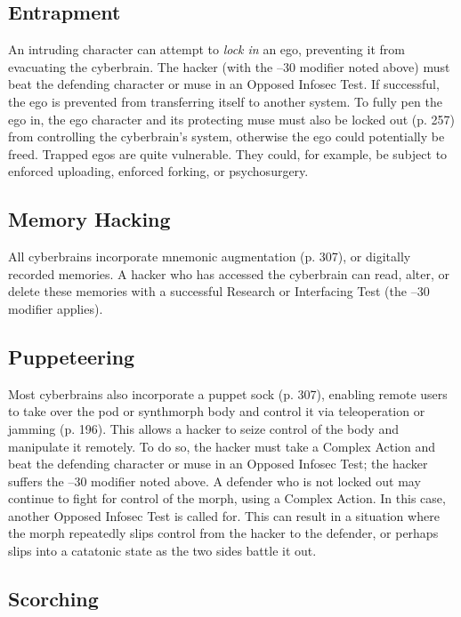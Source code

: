 \subsection{Entrapment}

An intruding character can attempt to \textit{lock in} an ego, 
preventing it from evacuating the cyberbrain. The 
hacker (with the –30 modifier noted above) must 
beat the defending character or muse in an Opposed 
Infosec Test. If successful, the ego is prevented from 
transferring itself to another system.
To fully pen the ego in, the ego character and its 
protecting muse must also be locked out (p. 257) from 
controlling the cyberbrain's system, otherwise the ego 
could potentially be freed.
 Trapped egos are quite vulnerable. They could, for 
example, be subject to enforced uploading, enforced 
forking, or psychosurgery.

\subsection{Memory Hacking}

All cyberbrains incorporate mnemonic augmentation 
(p. 307), or digitally recorded memories. A hacker 
who has accessed the cyberbrain can read, alter, or 
delete these memories with a successful Research or 
Interfacing Test (the –30 modifier applies).

\subsection{Puppeteering}

Most cyberbrains also incorporate a puppet sock (p. 307), 
enabling remote users to take over the pod or synthmorph
body and control it via teleoperation or jamming
(p. 196). This allows a hacker to seize control of the body 
and manipulate it remotely. To do so, the hacker must 
take a Complex Action and beat the defending character 
or muse in an Opposed Infosec Test; the hacker suffers 
the –30 modifier noted above.
A defender who is not locked out may continue 
to fight for control of the morph, using a Complex 
Action. In this case, another Opposed Infosec Test 
is called for. This can result in a situation where the 
morph repeatedly slips control from the hacker to the 
defender, or perhaps slips into a catatonic state as the 
two sides battle it out.

\subsection{Scorching}


